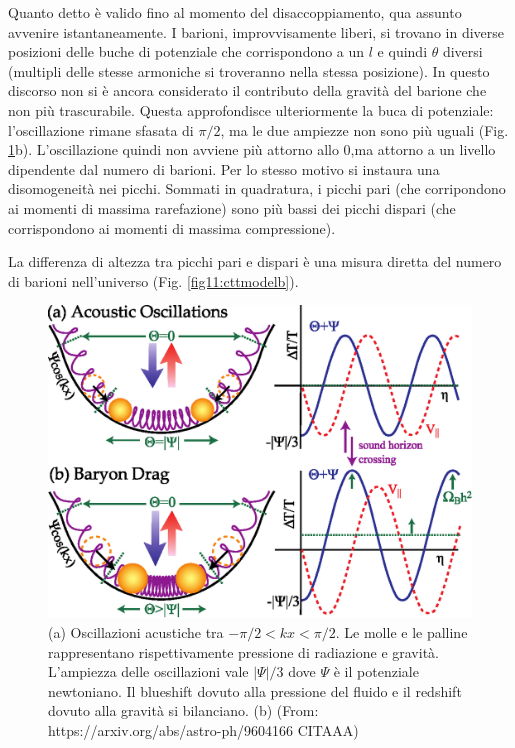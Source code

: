 \vspace{1em}
Quanto detto è valido fino al momento del disaccoppiamento, qua assunto avvenire istantaneamente. I barioni, improvvisamente liberi, si trovano in diverse posizioni delle buche di potenziale che corrispondono a un $l$ e quindi $\theta$ diversi (multipli delle stesse armoniche si troveranno nella stessa posizione). In questo discorso non si è ancora considerato il contributo della gravità del barione che non più trascurabile. Questa approfondisce ulteriormente la buca di potenziale: l'oscillazione rimane sfasata di $\pi/2$, ma le due ampiezze non sono più uguali (Fig. \ref{fig11:osc}b). L'oscillazione quindi non avviene più attorno allo $0$,ma attorno a un livello dipendente dal numero di barioni. Per  lo stesso motivo si instaura una disomogeneità nei picchi. Sommati in quadratura, i picchi pari (che corripondono ai momenti di massima rarefazione) sono più bassi dei picchi dispari (che corrispondono ai momenti di massima compressione). 
\begin{definition}
    La differenza di altezza tra picchi pari e dispari è una misura diretta del numero di barioni nell'universo (Fig. \ref{fig11:cttmodelb}).
\end{definition}

\begin{figure}[H]
    \centering
    \includegraphics[width=.75 \textwidth]{Pictures/11/OscDrag.eps}
    \caption{(a) Oscillazioni acustiche tra $-\pi/2 <kx <\pi/2$. Le molle e le palline rappresentano rispettivamente pressione di radiazione e gravità. L'ampiezza delle oscillazioni vale $|\Psi|/3$ dove $\Psi$ è il potenziale newtoniano. Il blueshift dovuto alla pressione del fluido e il redshift dovuto alla gravità si bilanciano. (b)   (From: https://arxiv.org/abs/astro-ph/9604166 CITAAA)}\label{fig11:osc}
\end{figure}

